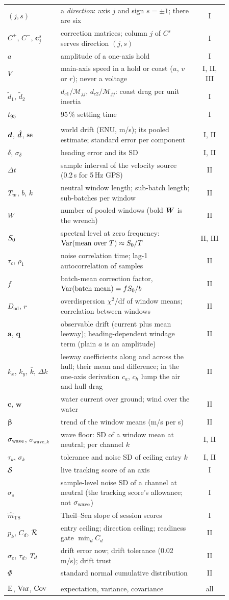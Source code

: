 \begin{longtable}{@{}>{\raggedright}p{0.24\linewidth}>{\raggedright}p{0.62\linewidth}c@{}}
  $(j, s)$ & a \emph{direction}: axis $j$ and sign $s = \pm1$; there are six & I\tabularnewline
  $C^+$, $C^-$, $\bm c_j^s$ & correction matrices; column $j$ of $C^s$ serves direction $(j, s)$ & I\tabularnewline
  $a$ & amplitude of a one-axis hold & I\tabularnewline
  $V$ & main-axis speed in a hold or coast ($u$, $v$ or $r$); never a voltage & I, II, III\tabularnewline
  $\tilde d_1$, $\tilde d_2$ & $d_{c1}/\mathcal M_{jj}$, $d_{c2}/\mathcal M_{jj}$: coast drag per unit inertia & I\tabularnewline
  $t_{95}$ & 95\,\% settling time & I\tabularnewline
  \midrule
  \multicolumn{3}{@{}l}{\emph{Water, noise and trust}}\tabularnewline
  $\bm d$, $\hat{\bm d}$, $\mathrm{se}$ & world drift (ENU, m/s); its pooled estimate; standard error per component & I, II\tabularnewline
  $\delta$, $\sigma_\delta$ & heading error and its SD & I, II\tabularnewline
  $\Delta t$ & sample interval of the velocity source (0.2\,s for 5\,Hz GPS) & II\tabularnewline
  $T_w$, $b$, $k$ & neutral window length; sub-batch length; sub-batches per window & II\tabularnewline
  $W$ & number of pooled windows (bold $\bm{W}$ is the wrench) & II\tabularnewline
  $S_0$ & spectral level at zero frequency: $\operatorname{Var}(\text{mean over }T)\approx S_0/T$ & II, III\tabularnewline
  $\tau_c$, $\rho_1$ & noise correlation time; lag-1 autocorrelation of samples & II\tabularnewline
  $f$ & batch-mean correction factor, $\operatorname{Var}(\text{batch mean}) = fS_0/b$ & II\tabularnewline
  $D_{\mathrm{od}}$, $r$ & overdispersion $\chi^2/\mathrm{df}$ of window means; correlation between windows & II\tabularnewline
  $\bm a$, $\bm q$ & observable drift (current plus mean leeway); heading-dependent windage term (plain $a$ is an amplitude) & II\tabularnewline
  $k_x$, $k_y$, $\bar k$, $\Delta k$ & leeway coefficients along and across the hull; their mean and difference; in the one-axis derivation $c_a$, $c_h$ lump the air and hull drag & II\tabularnewline
  $\bm c$, $\bm w$ & water current over ground; wind over the water & II\tabularnewline
  $\bm\beta$ & trend of the window means (m/s per s) & II\tabularnewline
  $\sigma_{\mathrm{wave}}$, $\sigma_{\mathrm{wave},k}$ & wave floor: SD of a window mean at neutral; per channel $k$ & I, II\tabularnewline
  $\tau_k$, $\sigma_k$ & tolerance and noise SD of ceiling entry $k$ & I, II\tabularnewline
  $\mathcal{S}$ & live tracking score of an axis & I\tabularnewline
  $\sigma_s$ & sample-level noise SD of a channel at neutral (the tracking score's allowance; not $\sigma_{\mathrm{wave}}$) & I\tabularnewline
  $\hat m_{\mathrm{TS}}$ & Theil--Sen slope of session scores & I\tabularnewline
  $p_k$, $C_d$, $\mathcal R$ & entry ceiling; direction ceiling; readiness gate $\min_d C_d$ & II\tabularnewline
  $\sigma_e$, $\tau_d$, $T_d$ & drift error now; drift tolerance (0.02\,m/s); drift trust & II\tabularnewline
  $\Phi$ & standard normal cumulative distribution & II\tabularnewline
  \midrule
  \multicolumn{3}{@{}l}{\emph{Statistics}}\tabularnewline
  $\operatorname{E}$, $\operatorname{Var}$, $\operatorname{Cov}$ & expectation, variance, covariance & all\tabularnewline
\end{longtable}
\normalsize


